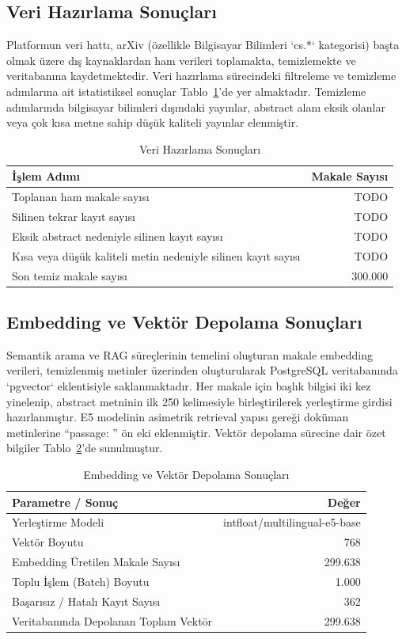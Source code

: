 \subsection{Veri Hazırlama Sonuçları}
Platformun veri hattı, arXiv (özellikle Bilgisayar Bilimleri `cs.*` kategorisi) başta olmak üzere dış kaynaklardan ham verileri toplamakta, temizlemekte ve veritabanına kaydetmektedir. Veri hazırlama sürecindeki filtreleme ve temizleme adımlarına ait istatistiksel sonuçlar Tablo~\ref{tab:veri_hazirlama}'de yer almaktadır. Temizleme adımlarında bilgisayar bilimleri dışındaki yayınlar, abstract alanı eksik olanlar veya çok kısa metne sahip düşük kaliteli yayınlar elenmiştir.

\begin{table}[H]
\centering
\caption{Veri Hazırlama Sonuçları}
\label{tab:veri_hazirlama}
\begin{tabular}{lr}
\hline
İşlem Adımı & Makale Sayısı \\
\hline
Toplanan ham makale sayısı & TODO \\
Silinen tekrar kayıt sayısı & TODO \\
Eksik abstract nedeniyle silinen kayıt sayısı & TODO \\
Kısa veya düşük kaliteli metin nedeniyle silinen kayıt sayısı & TODO \\
Son temiz makale sayısı & 300.000 \\
\hline
\end{tabular}
\end{table}

\subsection{Embedding ve Vektör Depolama Sonuçları}
Semantik arama ve RAG süreçlerinin temelini oluşturan makale embedding verileri, temizlenmiş metinler üzerinden oluşturularak PostgreSQL veritabanında `pgvector` eklentisiyle saklanmaktadır. Her makale için başlık bilgisi iki kez yinelenip, abstract metninin ilk 250 kelimesiyle birleştirilerek yerleştirme girdisi hazırlanmıştır. E5 modelinin asimetrik retrieval yapısı gereği doküman metinlerine ``passage: '' ön eki eklenmiştir. Vektör depolama sürecine dair özet bilgiler Tablo~\ref{tab:embedding_ve_vektor_depolama}'de sunulmuştur.

\begin{table}[H]
\centering
\caption{Embedding ve Vektör Depolama Sonuçları}
\label{tab:embedding_ve_vektor_depolama}
\begin{tabular}{lr}
\hline
Parametre / Sonuç & Değer \\
\hline
Yerleştirme Modeli & intfloat/multilingual-e5-base \\
Vektör Boyutu & 768 \\
Embedding Üretilen Makale Sayısı & 299.638 \\
Toplu İşlem (Batch) Boyutu & 1.000 \\
Başarısız / Hatalı Kayıt Sayısı & 362 \\
Veritabanında Depolanan Toplam Vektör & 299.638 \\
\hline
\end{tabular}
\end{table}

